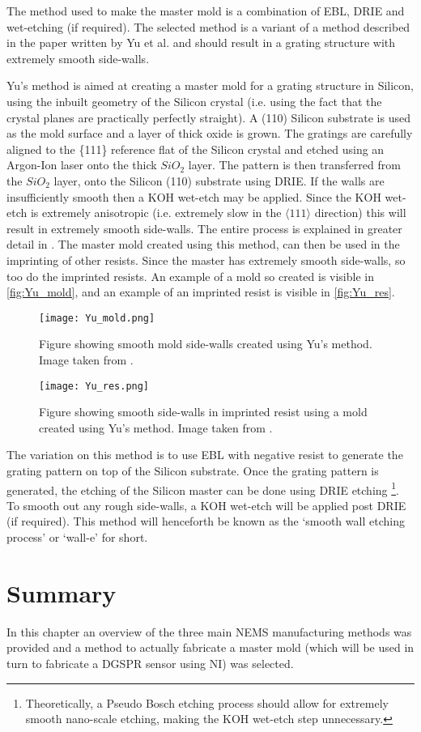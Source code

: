 The method used to make the master mold is a combination of EBL, DRIE and wet-etching (if required). The selected method is a variant of a method described in the paper written by Yu et al. \cite{sexy_des_method} and should result in a grating structure with extremely smooth side-walls.  

Yu's method is aimed at creating a master mold for a grating structure in Silicon, using the inbuilt geometry of the Silicon crystal (i.e. using the fact that the crystal planes are practically perfectly straight). A (110) Silicon substrate is used as the mold surface and a layer of thick oxide is grown. The gratings are carefully aligned to the \{111\} reference flat of the Silicon crystal and etched using an Argon-Ion laser onto the thick $SiO_2$ layer. The pattern is then transferred from the $SiO_2$ layer, onto the Silicon (110) substrate using DRIE. If the walls are insufficiently smooth then a KOH wet-etch may be applied. Since the KOH wet-etch is extremely anisotropic (i.e. extremely slow in the $\langle 111 \rangle$ direction) this will result in extremely smooth side-walls. The entire process is explained in greater detail in \cite{sexy_des_method}. The master mold created using this method, can then be used in the imprinting of other resists. Since the master has extremely smooth side-walls, so too do the imprinted resists. An example of a mold so created is visible in \autoref{fig:Yu_mold}, and an example of an imprinted resist is visible in \autoref{fig:Yu_res}.

\begin{figure}
\centering
\texttt{[image: Yu\_mold.png]}
\caption{Figure showing smooth mold side-walls created using Yu's method. Image taken from \cite{sexy_des_method}.}
\label{fig:Yu_mold}
\end{figure}

\begin{figure}
\centering
\texttt{[image: Yu\_res.png]}
\caption{Figure showing smooth side-walls in imprinted resist using a mold created using Yu's method. Image taken from \cite{sexy_des_method}.}
\label{fig:Yu_res}
\end{figure}

The variation on this method is to use EBL with negative resist to generate the grating pattern on top of the Silicon substrate. Once the grating pattern is generated, the etching of the Silicon master can be done using DRIE etching \footnote{Theoretically, a Pseudo Bosch etching process should allow for extremely smooth nano-scale etching, making the KOH wet-etch step unnecessary.}. To smooth out any rough side-walls, a KOH wet-etch will be applied post DRIE (if required). This method will henceforth be known as the `smooth wall etching process' or `wall-e' for short. %

\section{Summary}

In this chapter an overview of the three main NEMS manufacturing methods was provided and a method to actually fabricate a master mold (which will be used in turn to fabricate a DGSPR sensor using NI) was selected.  
